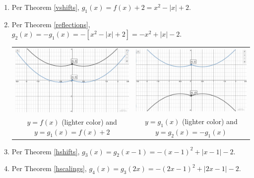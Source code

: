 \begin{ex}
\begin{enumerate}
\item  Per Theorem \ref{vshifts}, $g_{1}(x) = f(x) + 2 = x^2-|x|+2$.

\item  Per Theorem \ref{reflections}, $g_{2}(x) = -g_{1}(x) =  -[x^2-|x|+2] = -x^2+|x|-2$.

\begin{center}

\begin{tabular}{cc}

\includegraphics[width=3in]{./TransformationsGraphics/TransformationsEx04a.jpg} & \includegraphics[width=3in]{./TransformationsGraphics/TransformationsEx04b.jpg} \\

$y=f(x)$ (lighter color) and $y=g_{1}(x) = f(x)+2$ &  $y = g_{1}(x)$ (lighter color) and $y = g_{2}(x) = -g_{1}(x)$ \\

\end{tabular}

\end{center} 

\item  Per Theorem \ref{hshifts}, $g_{3}(x) = g_{2}(x-1) = -(x-1)^2+|x-1|-2$.

\item  Per Theorem \ref{hscalings}, $g_{4}(x) = g_{3}(2x) = -(2x-1)^2+|2x-1| - 2$.

\begin{center}

\begin{tabular}{cc}


\end{tabular}
\end{center}
\end{enumerate}
\end{ex}
